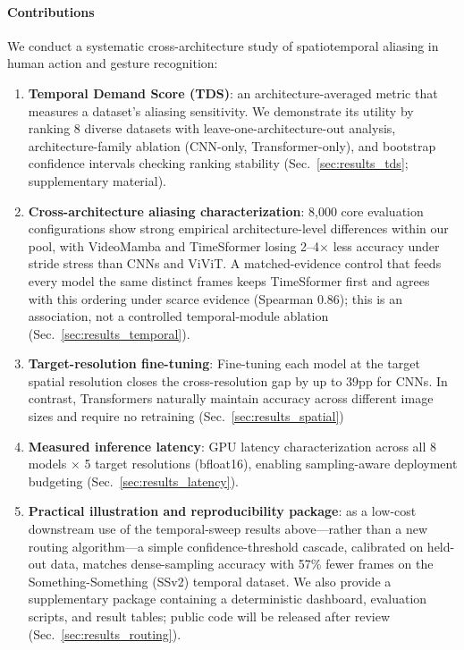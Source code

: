 \documentclass[a4paper, 10pt, conference]{ieeeconf}
\newcommand{\TDS}{\textsc{TDS}}
\begin{document}
\paragraph{Contributions}
We conduct a systematic cross-architecture study of spatiotemporal aliasing in human action and gesture recognition:
\begin{enumerate}
\item \textbf{Temporal Demand Score (\TDS{})}: an architecture-averaged metric that measures a dataset's aliasing sensitivity. We demonstrate its utility by ranking 8 diverse datasets with leave-one-architecture-out analysis, architecture-family ablation (CNN-only, Transformer-only), and bootstrap confidence intervals checking ranking stability (Sec.~\ref{sec:results_tds}; supplementary material). 
\item \textbf{Cross-architecture aliasing characterization}: 8,000 core evaluation
configurations show strong empirical architecture-level differences within our pool, with VideoMamba and TimeSformer losing 2--4$\times$ less accuracy under stride stress than CNNs and ViViT. A matched-evidence control that feeds every model the same distinct frames keeps TimeSformer first and agrees with this ordering under scarce evidence (Spearman $0.86$); this is an association, not a controlled temporal-module ablation (Sec.~\ref{sec:results_temporal}).
\item \textbf{Target-resolution fine-tuning}: Fine-tuning each model at the target spatial resolution closes the cross-resolution gap by up to 39pp for CNNs. In contrast, Transformers naturally maintain accuracy across different image sizes and require no retraining (Sec.~\ref{sec:results_spatial})
\item \textbf{Measured inference latency}: GPU latency characterization
across all 8 models $\times$ 5 target resolutions (bfloat16), enabling sampling-aware deployment budgeting (Sec.~\ref{sec:results_latency}).
\item \textbf{Practical illustration and reproducibility package}: as a low-cost downstream use of the temporal-sweep results above---rather than a new routing algorithm---a simple confidence-threshold cascade, calibrated on held-out data, matches dense-sampling accuracy with 57\% fewer frames on the Something-Something (SSv2) temporal dataset. We also provide a supplementary package containing a deterministic dashboard, evaluation scripts, and result tables; public code will be released after review (Sec.~\ref{sec:results_routing}).
\end{enumerate}
\end{document}
